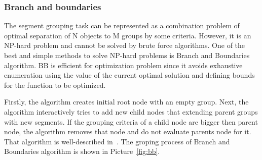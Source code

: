 \documentclass{lutmscthesis}[2010/09/22]
\begin{document}
\begin{figure}[htp]
\end{figure}

\subsubsection{Branch and boundaries}
The segment grouping task can be represented as a combination problem of optimal separation of N objects to M groups by some criteria. However, it is an NP-hard problem and cannot be solved by brute force algorithms. One of the best and simple methods to solve NP-hard problems is Branch and Boundaries algorithm.  BB is efficient for optimization problem since it avoids exhaustive enumeration using the value of the current optimal solution
and defining bounds for the function to be optimized. 

Firstly, the algorithm creates initial root node with an empty group. Next, the algorithm interactively tries to add new child nodes that extending parent groups with new segments. If the grouping criteria of a child node are bigger then parent node, the algorithm removes that node and do not evaluate parents node for it. That algorithm is well-described in~\cite{zafari-bb}.  The groping process of Branch and Boundaries algorithm is shown in Picture~\ref{fig:bb}.

\begin{figure}[htp]
\end{figure}
\end{document}
